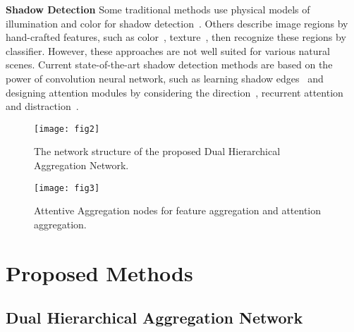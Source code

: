 \documentclass[letterpaper]{article} \usepackage{aaai20}  \usepackage{times}  \usepackage{helvet} \usepackage{courier}  \usepackage[hyphens]{url}  \urlstyle{rm} \def\UrlFont{\rm}  \usepackage{graphicx}  \frenchspacing  \setlength{\pdfpagewidth}{8.5in}  \setlength{\pdfpageheight}{11in}  \usepackage{amssymb}
\begin{document}
\noindent\textbf{Shadow Detection}
Some traditional methods use physical models of illumination and color for shadow detection~\cite{salvador2004cast,panagopoulos2011illumination}. Others describe image regions by hand-crafted features, such as color~\cite{lalonde2010detecting}, texture~\cite{vicente2017leave}, then recognize these regions by classifier. However, these approaches are not well suited for various natural scenes.
Current state-of-the-art shadow detection methods are based on the power of convolution neural network, such as learning shadow edges~\cite{khan2015automatic,shen2015shadow} and 
designing attention modules by considering the direction~\cite{Hu:2018wd}, recurrent attention~\cite{zhu2018bidirectional} and distraction~\cite{zheng2019distraction}.

\begin{figure*}[t]
	\centering
  \texttt{[image: fig2]}
  \caption{The network structure of the proposed  Dual Hierarchical Aggregation Network.}
  \label{fig:network_structure}
\end{figure*}

\begin{figure}[b]
\centering
\texttt{[image: fig3]}
  \caption{Attentive Aggregation nodes for feature aggregation and attention aggregation.}
  \label{fig:aan}
\end{figure}

\section{Proposed Methods}


\subsection{Dual Hierarchical Aggregation Network}
\end{document}
